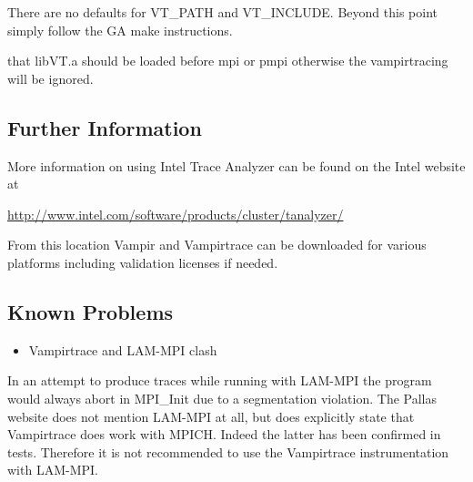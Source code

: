 There are no defaults for VT\_PATH and VT\_INCLUDE. Beyond this point
simply follow the GA make instructions.

that libVT.a should be loaded before mpi or pmpi otherwise
the vampirtracing will be ignored. 


\subsection{Further Information }

More information on using Intel Trace Analyzer can be found on the
Intel website at

\href{http://www.intel.com/software/products/cluster/tanalyzer/}{http://www.intel.com/software/products/cluster/tanalyzer/}

From this location Vampir and Vampirtrace can be downloaded for various
platforms including validation licenses if needed.


\subsection{Known Problems}
\begin{itemize}
\item Vampirtrace and LAM-MPI clash
\end{itemize}
In an attempt to produce traces while running with LAM-MPI the program
would always abort in MPI\_Init due to a segmentation violation. The
Pallas website does not mention LAM-MPI at all, but does explicitly
state that Vampirtrace does work with MPICH. Indeed the latter has
been confirmed in tests. Therefore it is not recommended to use the
Vampirtrace instrumentation with LAM-MPI. 
